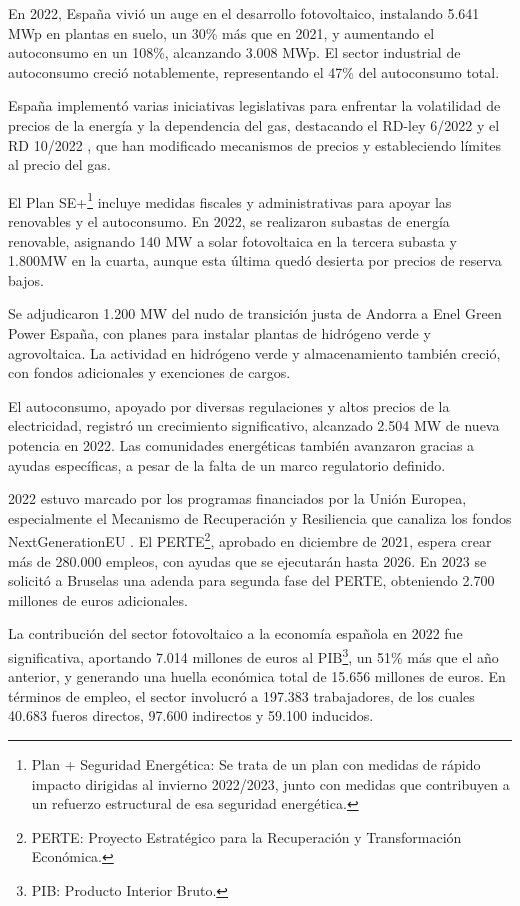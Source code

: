 En 2022, España vivió un auge en el desarrollo fotovoltaico, instalando 5.641 MWp en plantas en suelo, un 30\% más que en 2021, y aumentando el autoconsumo en un 108\%, alcanzando 3.008 MWp. El sector industrial de autoconsumo creció notablemente, representando el 47\% del autoconsumo total.

España implementó varias iniciativas legislativas para enfrentar la volatilidad de precios de la energía y la dependencia del gas, destacando el RD-ley 6/2022 \cite{boe622} y el RD 10/2022 \cite{boe1022}, que han modificado mecanismos de precios y estableciendo límites al precio del gas.

El Plan SE+\footnote{Plan + Seguridad Energética: Se trata de un plan con medidas de rápido impacto dirigidas al invierno 2022/2023, junto con medidas que contribuyen a un refuerzo estructural de esa seguridad energética.} \cite{demografico22} incluye medidas fiscales y administrativas para apoyar las renovables y el autoconsumo. En 2022, se realizaron subastas de energía renovable, asignando 140 MW a solar fotovoltaica en la tercera subasta y 1.800MW en la cuarta, aunque esta última quedó desierta por precios de reserva bajos.

Se adjudicaron 1.200 MW del nudo de transición justa de Andorra a Enel Green Power España, con planes para instalar plantas de hidrógeno verde y agrovoltaica. La actividad en hidrógeno verde y almacenamiento también creció, con fondos adicionales y exenciones de cargos.

El autoconsumo, apoyado por diversas regulaciones y altos precios de la electricidad, registró un crecimiento significativo, alcanzado 2.504 MW de nueva potencia en 2022. Las comunidades energéticas también avanzaron gracias a ayudas específicas, a pesar de la falta de un marco regulatorio definido.

2022 estuvo marcado por los programas financiados por la Unión Europea, especialmente el Mecanismo de Recuperación y Resiliencia \cite{hacienda22} que canaliza los fondos NextGenerationEU \cite{union20}. El PERTE\footnote{PERTE: Proyecto Estratégico para la Recuperación y Transformación Económica.}, aprobado en diciembre de 2021, espera crear más de 280.000 empleos, con ayudas que se ejecutarán hasta 2026. En 2023 se solicitó a Bruselas una adenda para segunda fase del PERTE, obteniendo 2.700 millones de euros adicionales.

La contribución del sector fotovoltaico a la economía española en 2022 fue significativa, aportando 7.014 millones de euros al PIB\footnote{PIB: Producto Interior Bruto.}, un 51\% más que el año anterior, y generando una huella económica total de 15.656 millones de euros. En términos de empleo, el sector involucró a 197.383 trabajadores, de los cuales 40.683 fueros directos, 97.600 indirectos y 59.100 inducidos.

